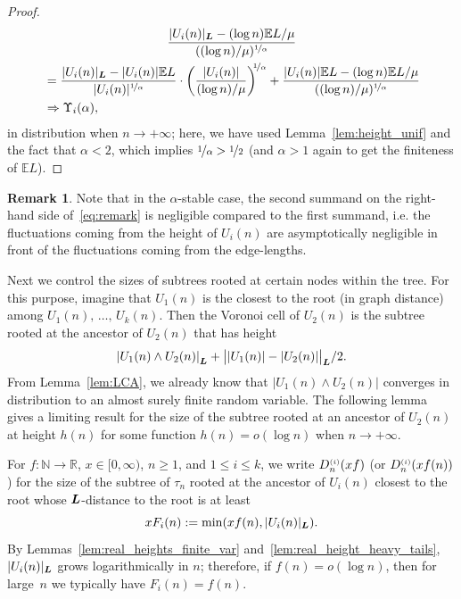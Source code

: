 \documentclass[10pt]{amsart}
\theoremstyle{definition}\newtheorem{defi}[theo]{Definition}\newtheorem{rema}[theo]{Remark}\newtheorem{exam}[theo]{Example}\newtheorem{exem}[theo]{Example}\newtheorem{nota}[theo]{Notation}
\newcommand{\bs}{\ensuremath{\boldsymbol}}
\newcommand{\sss}{\ensuremath{\scriptscriptstyle}}
\newcommand{\bbE}{\mathbb{E}}
\newcommand{\bbN}{\mathbb{N}}
\newcommand{\bbR}{\mathbb{R}}
\begin{document}
\begin{proof}
\begin{multline}\label{eq:remark}
\frac{|U_i(n)|_{\bs L}-(\log n)\bbE L/\mu}{((\log n)/\mu)^{\nicefrac1\alpha}}\\
\begin{aligned}
&= \frac{|U_i(n)|_{\bs L}-|U_i(n)|\bbE L}{|U_i(n)|^{\nicefrac1\alpha}}
\cdot \bigg(\frac{|U_i(n)|}{(\log n)/\mu}\bigg)^{\!\!\nicefrac1\alpha} + \frac{|U_i(n)|\bbE L-(\log n)\bbE L/\mu}{((\log n)/\mu)^{\nicefrac1\alpha}}\\
&\Rightarrow\Upsilon_i(\alpha),
\end{aligned}
\end{multline}
in distribution when $n\to+\infty$; here, we have used Lemma~\ref{lem:height_unif} and the fact that $\alpha<2$, which implies $\nicefrac1\alpha>\nicefrac12$ (and $\alpha > 1$ again to get the finiteness of $\bbE L$).
\end{proof}

\begin{rema}
Note that in the $\alpha$-stable case, the second summand on the right-hand side of~\eqref{eq:remark} is negligible compared to the first summand, i.e. the fluctuations coming from the height of $U_i(n)$ are asymptotically negligible in front of the fluctuations coming from the edge-lengths.
\end{rema}

Next we control the sizes of subtrees rooted at certain nodes within the tree. For this purpose, imagine that $U_1(n)$ is the closest to the root (in graph distance) among $U_1(n), \,\ldots,\, U_k(n)$. Then the Voronoi cell of $U_2(n)$ is the subtree rooted at the ancestor of $U_2(n)$ that has height
\[
\left|U_1(n)\wedge U_2(n)\right|_{\bs L} + \big||U_1(n)|-|U_2(n)|\big|_{\bs L}/2.
\]
From Lemma~\ref{lem:LCA}, we already know that $|U_1(n)\wedge U_2(n)|$ converges in distribution to an almost surely finite random variable. The following lemma gives a limiting result for the size of the subtree rooted at an ancestor of $U_2(n)$ at height $h(n)$ for some function $h(n) = o(\log n)$ when $n\to+\infty$.

For $f\colon \bbN\to \bbR$, $x\in[0, \infty)$, $n\geq 1$, and $1\leq i\leq k$, we write $D^{\sss (i)}_n(xf)$ (or $D^{\sss (i)}_n(xf(n))$) for the size of the subtree of $\tau_n$ rooted at the ancestor of $U_i(n)$ closest to the root whose $\bs L$-distance to the root is at least
\begin{equation}\label{eq:Fdef}
xF_i(n):=\min(xf(n), |U_i(n)|_{\bs L}).
\end{equation}
By Lemmas~\ref{lem:real_heights_finite_var} and~\ref{lem:real_height_heavy_tails}, $|U_i(n)|_{\bs L}$ grows logarithmically in $n$; therefore, if $f(n)=o(\log n)$, then for large~$n$ we typically have $F_i(n)=f(n)$.
\end{document}

